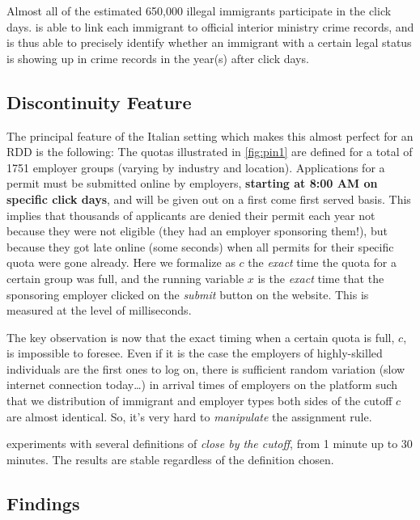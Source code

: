 \documentclass[]{book}
\begin{document}
Almost all of the estimated 650,000 illegal immigrants participate in
the click days. \citet{pinotti} is able to link each immigrant to
official interior ministry crime records, and is thus able to precisely
identify whether an immigrant with a certain legal status is showing up
in crime records in the year(s) after click days.

\subsection{Discontinuity Feature}\label{discontinuity-feature}

The principal feature of the Italian setting which makes this almost
perfect for an RDD is the following: The quotas illustrated in
\ref{fig:pin1} are defined for a total of 1751 employer groups (varying
by industry and location). Applications for a permit must be submitted
online by employers, \textbf{starting at 8:00 AM on specific click
days}, and will be given out on a first come first served basis. This
implies that thousands of applicants are denied their permit each year
not because they were not eligible (they had an employer sponsoring
them!), but because they got late online (some seconds) when all permits
for their specific quota were gone already. Here we formalize as \(c\)
the \emph{exact} time the quota for a certain group was full, and the
running variable \(x\) is the \emph{exact} time that the sponsoring
employer clicked on the \emph{submit} button on the website. This is
measured at the level of milliseconds.

The key observation is now that the exact timing when a certain quota is
full, \(c\), is impossible to foresee. Even if it is the case the
employers of highly-skilled individuals are the first ones to log on,
there is sufficient random variation (slow internet connection
today\ldots{}) in arrival times of employers on the platform such that
we distribution of immigrant and employer types both sides of the cutoff
\(c\) are almost identical. So, it's very hard to \emph{manipulate} the
assignment rule.

\citet{pinotti} experiments with several definitions of \emph{close by
the cutoff}, from 1 minute up to 30 minutes. The results are stable
regardless of the definition chosen.

\subsection{Findings}\label{findings}
\end{document}
